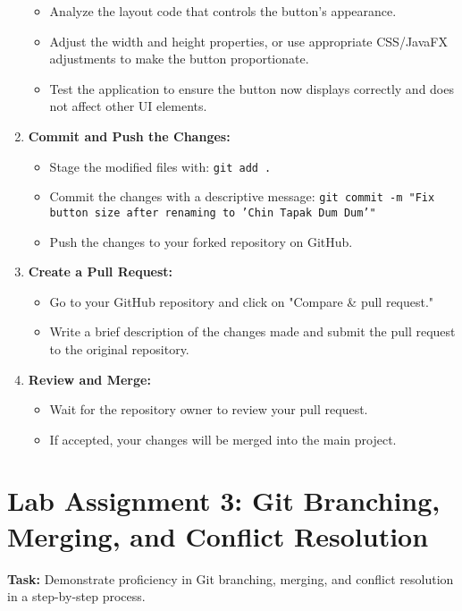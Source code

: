 \documentclass[a4paper,12pt]{article}
\begin{document}
\begin{enumerate}[label=\arabic*.]
    \begin{itemize}
        \item Analyze the layout code that controls the button's appearance.
        \item Adjust the width and height properties, or use appropriate CSS/JavaFX adjustments to make the button proportionate.
        \item Test the application to ensure the button now displays correctly and does not affect other UI elements.
    \end{itemize}
    \item \textbf{Commit and Push the Changes:}
    \begin{itemize}
        \item Stage the modified files with: \texttt{git add .}
        \item Commit the changes with a descriptive message: \texttt{git commit -m "Fix button size after renaming to 'Chin Tapak Dum Dum'"}
        \item Push the changes to your forked repository on GitHub.
    \end{itemize}
    \item \textbf{Create a Pull Request:}
    \begin{itemize}
        \item Go to your GitHub repository and click on "Compare \& pull request."
        \item Write a brief description of the changes made and submit the pull request to the original repository.
    \end{itemize}
    \item \textbf{Review and Merge:}
    \begin{itemize}
        \item Wait for the repository owner to review your pull request.
        \item If accepted, your changes will be merged into the main project.
    \end{itemize}
\end{enumerate}

\section{Lab Assignment 3: Git Branching, Merging, and Conflict Resolution}

\textbf{Task:} Demonstrate proficiency in Git branching, merging, and conflict resolution in a step-by-step process.
\end{document}

